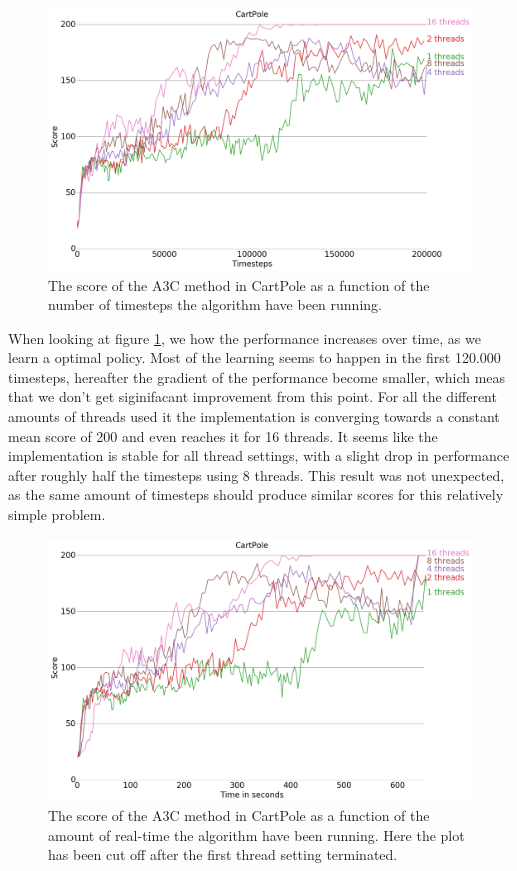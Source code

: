 \documentclass[11pt]{article}
\begin{document}
\begin{figure}[H]
    \centering
    \includegraphics[scale=0.4]{plots/cartpole_compare_counter_without_AC.png}
    \caption{The score of the A3C method in CartPole as a function
    of the number of timesteps the algorithm have been running.}
    \label{fig:a3c_time_steps}
\end{figure}
 

When looking at figure \ref{fig:a3c_time_steps}, we how the
performance increases over time, as we learn a optimal policy. 
Most of the learning seems to happen in the first 120.000 timesteps,
hereafter the gradient of the performance become smaller, which
meas that we don't get siginifacant improvement from this point.
For all the different amounts of threads used it the implementation
is converging towards a constant mean score of 200 and even reaches
it for 16 threads.
It seems like the implementation is stable for all thread settings, with a slight
drop in performance after roughly half the timesteps using 8 threads.
This result was not unexpected, as the same amount of timesteps should produce similar
scores for this relatively simple problem. 

\begin{figure}[H]
    \centering
    \includegraphics[scale=0.4]{plots/cartpole_compare_time_without_AC.png}
    \caption{The score of the A3C method in CartPole as a function
    of the amount of real-time the algorithm have been running.
    Here the plot has been cut off after the first thread setting
    terminated.}
    \label{fig:a3c_time}
\end{figure}
\end{document}
